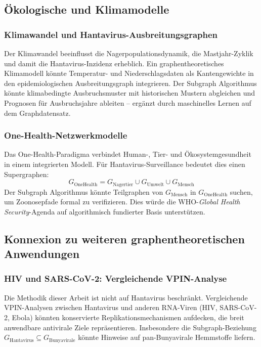 ﻿\documentclass[a4paper,12pt]{article}
\theoremstyle{definition}
\begin{document}
\subsection{\"Okologische und Klimamodelle}

\subsubsection{Klimawandel und Hantavirus-Ausbreitungsgraphen}

Der Klimawandel beeinflusst die Nagerpopulationsdynamik, die
Mastjahr-Zyklik und damit die Hantavirus-Inzidenz erheblich.
Ein graphentheoretisches Klimamodell k\"onnte Temperatur- und
Niederschlagsdaten als Kantengewichte in den epidemiologischen
Ausbreitungsgraph integrieren. Der Subgraph Algorithmus k\"onnte
klimabedingte Ausbruchsmuster mit historischen Mustern abgleichen
und Prognosen f\"ur Ausbruchsjahre ableiten -- erg\"anzt durch
maschinelles Lernen auf dem Graphdatensatz.

\subsubsection{One-Health-Netzwerkmodelle}

Das One-Health-Paradigma verbindet Human-, Tier- und \"Okosystemgesundheit
in einem integrierten Modell. F\"ur Hantavirus-Surveillance bedeutet dies
einen Supergraphen:
\[
    G_{\mathrm{OneHealth}} = G_{\mathrm{Nagertier}} \cup G_{\mathrm{Umwelt}} \cup
    G_{\mathrm{Mensch}}
\]
Der Subgraph Algorithmus k\"onnte Teilgraphen von $G_{\mathrm{Mensch}}$
in $G_{\mathrm{OneHealth}}$ suchen, um Zoonosepfade formal zu verifizieren.
Dies w\"urde die WHO-\emph{Global Health Security}-Agenda
auf algorithmisch fundierter Basis unterst\"utzen.

\subsection{Konnexion zu weiteren graphentheoretischen Anwendungen}

\subsubsection{HIV und SARS-CoV-2: Vergleichende VPIN-Analyse}

Die Methodik dieser Arbeit ist nicht auf Hantavirus beschr\"ankt.
Vergleichende VPIN-Analysen zwischen Hantavirus und anderen RNA-Viren
(HIV, SARS-CoV-2, Ebola) k\"onnten konservierte Replikationsmechanismen
aufdecken, die breit anwendbare antivirale Ziele repr\"asentieren.
Insbesondere die Subgraph-Beziehung $G_{\mathrm{Hantavirus}} \subseteq G_{\mathrm{Bunyavirale}}$
k\"onnte Hinweise auf pan-Bunyavirale Hemmstoffe liefern.
\end{document}
